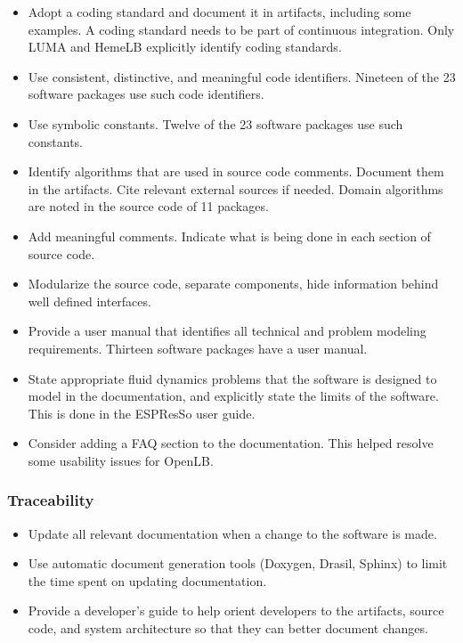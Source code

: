 \documentclass[12pt, notitlepage]{article}
\begin{document}
\begin{itemize}
	\item Adopt a coding standard and document it in artifacts, including some examples. A coding standard needs to be part of continuous integration. Only
	LUMA and HemeLB explicitly identify coding standards. 
	\item Use consistent, distinctive, and meaningful code identifiers. Nineteen of the 23 software packages use such code identifiers.
	\item Use symbolic constants. Twelve of the 23 software packages use such constants.
	\item Identify algorithms that are used in source code comments. Document them in the artifacts. Cite relevant external sources if needed. Domain algorithms are noted in the source code of 11 packages.
	\item Add meaningful comments. Indicate what is being done in each section of source code.
	\item Modularize the source code, separate components, hide information behind well defined interfaces.
	\item Provide a user manual that identifies all technical and problem modeling requirements. Thirteen software packages have a user manual.
	\item State appropriate fluid dynamics problems that the software is designed to model in the documentation, and explicitly state the limits of the software. This is done in the ESPResSo user guide. 
	\item Consider adding a FAQ section to the documentation. This helped resolve some usability issues for OpenLB.
\end{itemize}

\subsubsection{Traceability}

\begin{itemize}
	\item Update all relevant documentation when a change to the software is made.
	\item Use automatic document generation tools (Doxygen, Drasil, Sphinx) to limit the time spent on updating documentation.
	\item Provide a developer's guide to help orient developers to the artifacts, source code, and system architecture so that they can better document changes.  
\end{itemize}
\end{document}
